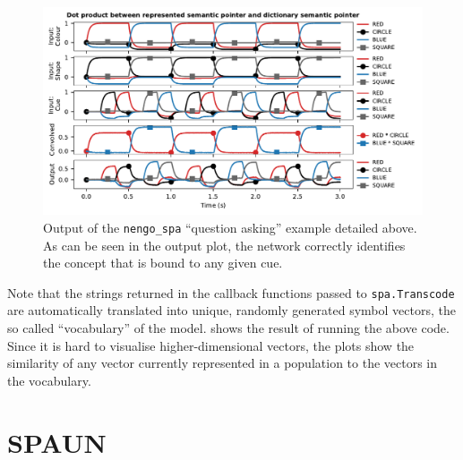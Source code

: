 \documentclass[10pt,letterpaper,oneside]{article}
\begin{document}
\begin{figure}
	\centering\hspace*{-0.33cm}\includegraphics{media/nengo_spa_example.pdf}
	\caption{Output of the \texttt{nengo\_spa} \enquote{question asking} example detailed above. As can be seen in the output plot, the network correctly identifies the concept that is bound to any given cue. }
	\label{fig:nengo_spa_example}
\end{figure}

Note that the strings returned in the callback functions passed to \texttt{spa.Transcode} are automatically translated into unique, randomly generated symbol vectors, the so called \enquote{vocabulary} of the model.  shows the result of running the above code. Since it is hard to visualise higher-dimensional vectors, the plots show the similarity of any vector currently represented in a population to the vectors in the vocabulary.


\section{SPAUN}
\end{document}
